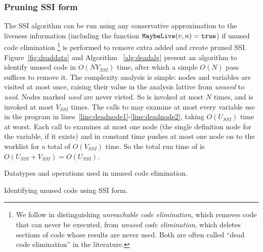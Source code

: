 \documentclass[12pt,titlepage,twoside]{article}
\begin{document}
\subsubsection{Pruning SSI form}\label{sec:unusedcode}
The SSI algorithm can be run using any conservative approximation to
the liveness information
(including the function $\texttt{MaybeLive}(v, n)=\texttt{true}$) if
unused code elimination%
\footnote{We follow \cite{wegman91:scc} in distinguishing
\emph{unreachable code elimination}, which removes code that can never
be executed, from \emph{unused code elimination}, which deletes
sections of code whose results are never used.  Both are often called
``dead code elimination'' in the literature.} is performed to remove
extra  added and create pruned SSI.
Figure~\ref{fig:deaddata} and Algorithm~%
\ref{alg:deadalg} present an algorithm to identify unused code in
$O(N V_{SSI})$ time, after which a simple $O(N)$ pass suffices to remove it.
The complexity analysis is simple: nodes and variables are visited at
most once, raising their value in the analysis lattive from
\emph{unused} to \emph{used}.  Nodes marked \emph{used} are never
visted.  So  is invoked at most $N$ times, and
 is invoked at most $V_{SSI}$ times.  The calls to
 may examine at most every variable use in the
program in lines~\ref{line:deadnode1}-\ref{line:deadnode2}, taking
$O(U_{SSI})$ time at worst. Each call
to  examines at most one node (the single
definition node for the variable, if it exists) and in constant time
pushes at most one node on to the worklist for a total of $O(V_{SSI})$ time.
So the total run time of  is
$O(U_{SSI}+V_{SSI})=O(U_{SSI})$.

\begin{myfigure}\small

\caption{Datatypes and operations used in unused code elimination.}
\label{fig:deaddata}
\end{myfigure}

\begin{myalgorithm}\small\linespread{0.75}

\caption{Identifying unused code using SSI form.}
\label{alg:deadalg}
\end{myalgorithm}
\end{document}
